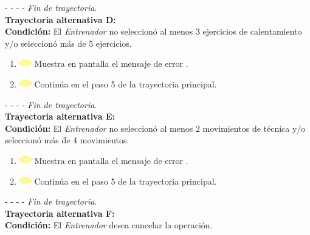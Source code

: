 - - - - \textit{Fin de trayectoria.} \\

\textbf{\large{Trayectoria alternativa D:}}\\
\textbf{Condición: } El \textit{Entrenador} no seleccionó al menos 3 ejercicios de calentamiento y/o seleccionó más de 5 ejercicios.

\begin{enumerate}
	\item \includegraphics[width=15pt]{./Figuras/iconosCU/herramienta.png} Muestra en pantalla el mensaje de error .
	\item \includegraphics[width=15pt]{./Figuras/iconosCU/herramienta.png} Continúa en el paso 5 de la trayectoria principal.
\end{enumerate}

- - - - \textit{Fin de trayectoria.} \\

\textbf{\large{Trayectoria alternativa E:}}\\
\textbf{Condición: } El \textit{Entrenador} no seleccionó al menos 2 movimientos de técnica y/o seleccionó más de 4 movimientos.

\begin{enumerate}
	\item \includegraphics[width=15pt]{./Figuras/iconosCU/herramienta.png} Muestra en pantalla el mensaje de error .
	\item \includegraphics[width=15pt]{./Figuras/iconosCU/herramienta.png} Continúa en el paso 5 de la trayectoria principal.
\end{enumerate}

- - - - \textit{Fin de trayectoria.} \\

\textbf{\large{Trayectoria alternativa F:}}\\
\textbf{Condición: } El \textit{Entrenador} desea cancelar la operación.


